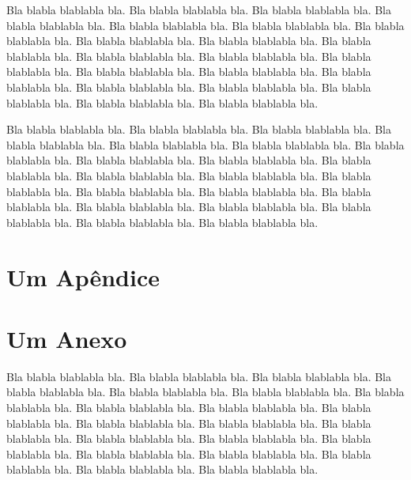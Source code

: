 \documentclass[tese,capa]{texufpel}
\begin{document}
Bla blabla blablabla bla.  Bla blabla blablabla bla.  Bla blabla
blablabla bla.  Bla blabla blablabla bla.  Bla blabla blablabla bla.
Bla blabla blablabla bla.  Bla blabla blablabla bla.  Bla blabla
blablabla bla.  Bla blabla blablabla bla.  Bla blabla blablabla bla.
Bla blabla blablabla bla.  Bla blabla blablabla bla.  Bla blabla
blablabla bla.  Bla blabla blablabla bla.  Bla blabla blablabla bla.
Bla blabla blablabla bla.  Bla blabla blablabla bla.  Bla blabla
blablabla bla.  Bla blabla blablabla bla.  Bla blabla blablabla bla.
Bla blabla blablabla bla.

Bla blabla blablabla bla.  Bla blabla blablabla bla.  Bla blabla
blablabla bla.  Bla blabla blablabla bla.  Bla blabla blablabla bla.
Bla blabla blablabla bla.  Bla blabla blablabla bla.  Bla blabla
blablabla bla.  Bla blabla blablabla bla.  Bla blabla blablabla bla.
Bla blabla blablabla bla.  Bla blabla blablabla bla.  Bla blabla
blablabla bla.  Bla blabla blablabla bla.  Bla blabla blablabla bla.
Bla blabla blablabla bla.  Bla blabla blablabla bla.  Bla blabla
blablabla bla.  Bla blabla blablabla bla.  Bla blabla blablabla bla.
Bla blabla blablabla bla.



 

\apendices
\chapter{Um Apêndice}

\anexos
\chapter{Um Anexo}

Bla blabla blablabla bla.  Bla blabla blablabla bla.  Bla blabla
blablabla bla.  Bla blabla blablabla bla.  Bla blabla blablabla bla.
Bla blabla blablabla bla.  Bla blabla blablabla bla.  Bla blabla
blablabla bla.  Bla blabla blablabla bla.  Bla blabla blablabla bla.
Bla blabla blablabla bla.  Bla blabla blablabla bla.  Bla blabla
blablabla bla.  Bla blabla blablabla bla.  Bla blabla blablabla bla.
Bla blabla blablabla bla.  Bla blabla blablabla bla.  Bla blabla
blablabla bla.  Bla blabla blablabla bla.  Bla blabla blablabla bla.
Bla blabla blablabla bla.
\end{document}
